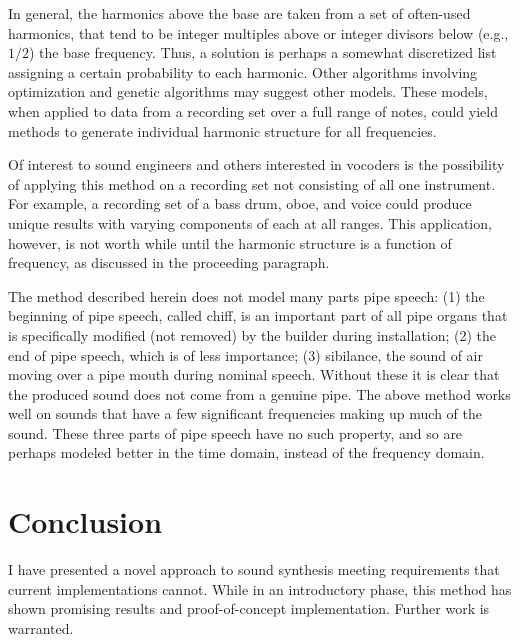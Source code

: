 \documentclass[twocolumn]{article}
\begin{document}
In general, the harmonics above the base are taken from a set of often-used harmonics, that tend to be integer multiples above or integer divisors below (e.g., $1/2$) the base frequency. Thus, a solution is perhaps a somewhat discretized list assigning a certain probability to each harmonic. Other algorithms involving optimization and genetic algorithms may suggest other models. These models, when applied to data from a recording set over a full range of notes, could yield methods to generate individual harmonic structure for all frequencies.

Of interest to sound engineers and others interested in vocoders is the possibility of applying this method on a recording set not consisting of all one instrument. For example, a recording set of a bass drum, oboe, and voice could produce unique results with varying components of each at all ranges. This application, however, is not worth while until the harmonic structure is a function of frequency, as discussed in the proceeding paragraph.

The method described herein does not model many parts pipe speech: (1) the beginning of pipe speech, called chiff, is an important part of all pipe organs that is specifically modified (not removed) by the builder during installation; (2) the end of pipe speech, which is of less importance; (3) sibilance, the sound of air moving over a pipe mouth during nominal speech. Without these it is clear that the produced sound does not come from a genuine pipe. The above method works well on sounds that have a few significant frequencies making up much of the sound. These three parts of pipe speech have no such property, and so are perhaps modeled better in the time domain, instead of the frequency domain.

\section{Conclusion}

I have presented a novel approach to sound synthesis meeting requirements that current implementations cannot. While in an introductory phase, this method has shown promising results and proof-of-concept implementation. Further work is warranted.
\end{document}
